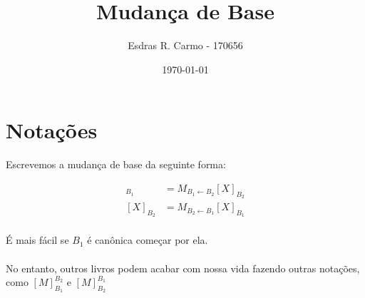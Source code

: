 \documentclass{article}
\author{Esdras R. Carmo - 170656}
\title{Mudança de Base}
\date{\today}
\newcommand{\mudabase}[3] {#1_{#2 \leftarrow #3}}
\begin{document}
    \maketitle

    \section{Notações}
        Escrevemos a mudança de base da seguinte forma:

        \begin{align*}
            [X]_{B_1} &= \mudabase{M}{B_1}{B_2} [X]_{B_2}\\
            [X]_{B_2} &= \mudabase{M}{B_2}{B_1} [X]_{B_1}\\
        \end{align*}

        É mais fácil se $B_1$ é canônica começar por ela.

        \paragraph{}
        No entanto, outros livros podem acabar com nossa vida fazendo outras notações,
        como $[M]_{B_1}^{B_2}$ e $[M]_{B_2}^{B_1}$
\end{document}
